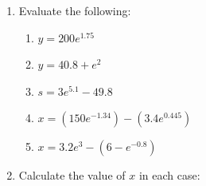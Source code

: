 \documentclass[
  english,
  12pt,
  oneside]{book}
\providecommand{\tightlist}{%
  \setlength{\itemsep}{0pt}\setlength{\parskip}{0pt}}
\theoremstyle{definition}
\theoremstyle{definition}
\theoremstyle{definition}
\theoremstyle{definition}
\theoremstyle{remark}
\begin{document}
\begin{enumerate}
\def\labelenumi{\arabic{enumi}.}
\item
  Evaluate the following:

  \begin{enumerate}
  \def\labelenumii{\roman{enumii})}
  \tightlist
  \item
    \(y=200e^{1.75}\)
  \item
    \(y=40.8+e^2\)
  \item
    \(s=3e^{5.1}-49.8\)
  \item
    \(x=(150e^{-1.34})-(3.4e^{0.445})\)
  \item
    \(x=3.2e^3 - (6-e^{-0.8})\)
  \end{enumerate}
\item
  Calculate the value of \(x\) in each case:


\end{enumerate}
\end{document}
